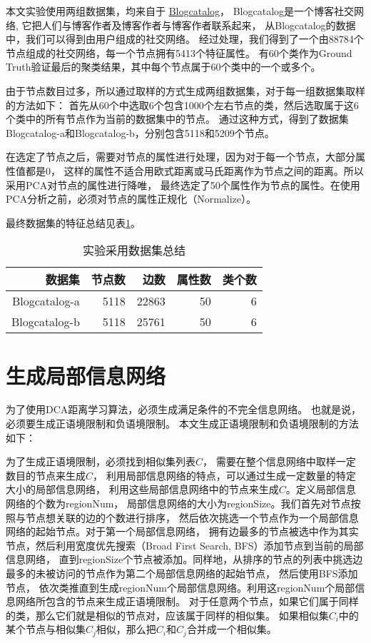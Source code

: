本文实验使用两组数据集，均来自于
\href{http://www.blogcatalog.com/}{Blogcatalog}，
Blogcatalog是一个博客社交网络, 它把人们与博客作者及博客作者与博客作者联系起来，
从Blogcatalog的数据中，我们可以得到由用户组成的社交网络。
经过处理，我们得到了一个由88784个节点组成的社交网络，每一个节点拥有5413个特征属性。
有60个类作为Ground Truth验证最后的聚类结果，其中每个节点属于60个类中的一个或多个。

由于节点数目过多，所以通过取样的方式生成两组数据集，对于每一组数据集取样的方法如下：
首先从60个中选取6个包含1000个左右节点的类，然后选取属于这6个类中的所有节点作为当前的数据集中的节点。
通过这种方式，得到了数据集Blogcatalog-a和Blogcatalog-b，分别包含5118和5209个节点。

在选定了节点之后，需要对节点的属性进行处理，因为对于每一个节点，大部分属性值都是0，
这样的属性不适合用欧式距离或马氏距离作为节点之间的距离。所以采用PCA对节点的属性进行降唯，
最终选定了50个属性作为节点的属性。在使用PCA分析之前，必须对节点的属性正规化（Normalize）。

最终数据集的特征总结见表\ref{tab:datasetsummary}。

\begin{table}[!hpb]
  \centering
  \caption{实验采用数据集总结}
  \label{tab:datasetsummary}
  \begin{tabular}{rrrrr} \toprule
    数据集 & 节点数 & 边数  & 属性数 & 类个数\\ \midrule
    Blogcatalog-a & 5118 & 22863 & 50 & 6 \\
    Blogcatalog-b & 5118 & 25761  & 50 & 6 \\ \bottomrule
  \end{tabular}
\end{table}


\section{生成局部信息网络}

为了使用DCA距离学习算法，必须生成满足条件的不完全信息网络。
也就是说，必须要生成正语境限制和负语境限制。
本文生成正语境限制和负语境限制的方法如下：

为了生成正语境限制，必须找到相似集列表$C$，
需要在整个信息网络中取样一定数目的节点来生成$C$，
利用局部信息网络的特点，可以通过生成一定数量的特定大小的局部信息网络，
利用这些局部信息网络中的节点来生成$C$。定义局部信息网络的个数为regionNum，
局部信息网络的大小为regionSize。我们首先对节点按照与节点想关联的边的个数进行排序，
然后依次挑选一个节点作为一个局部信息网络的起始节点。对于第一个局部信息网络，
拥有边最多的节点被选中作为其实节点，然后利用宽度优先搜索（Broad First Search, BFS）添加节点到当前的局部信息网络，
直到regionSize个节点被添加。同样地，从排序的节点的列表中挑选边最多的未被访问的节点作为第二个局部信息网络的起始节点，
然后使用BFS添加节点，
依次类推直到生成regionNum个局部信息网络。利用这regionNum个局部信息网络所包含的节点来生成正语境限制。
对于任意两个节点，如果它们属于同样的类，那么它们就是相似的节点对，应该属于同样的相似集。
如果相似集$C_i$中的某个节点与相似集$C_j$相似，那么把$C_i$和$C_j$合并成一个相似集。

